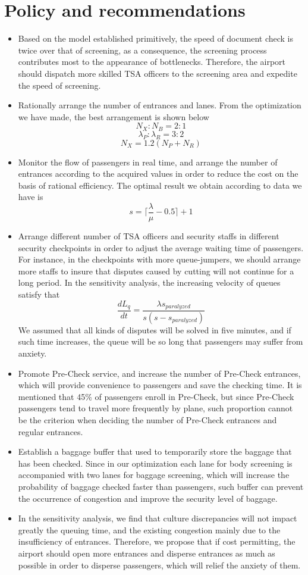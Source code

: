 \documentclass{mcmthesis}
\begin{document}
\section{Policy and recommendations}
\begin{itemize}
\item Based on the model established primitively, the speed of document check is twice over that of screening, as a consequence, the screening process contributes most to the appearance of bottlenecks. Therefore, the airport should dispatch more skilled TSA officers to the screening area and expedite the speed of screening.
\item Rationally arrange the number of entrances and lanes. From the optimization we have made, the best arrangement is shown below
$$N_X:N_B=2:1$$
$$\lambda_P:\lambda_R=3:2$$
$$N_X=1.2(N_P+N_R)$$
\item Monitor the flow of passengers in real time, and arrange the number of entrances according to the acquired values in order to reduce the cost on the basis of rational efficiency. The optimal result we obtain according to data we have is
$$s=\lceil\frac{\lambda}{\mu}-0.5\rceil+1$$
\item Arrange different number of TSA officers and security staffs in different security checkpoints in order to adjust the average waiting time of passengers. For instance, in the checkpoints with more queue-jumpers, we should arrange more staffs to insure that disputes caused by cutting will not continue for a long period. In the sensitivity analysis, the increasing velocity of queues satisfy that
$$\frac{dL_q}{dt}=\frac{\lambda s_{paralyzed}}{s(s-s_{paralyzed})}$$
We assumed that all kinds of disputes will be solved in five minutes, and if such time increases, the queue will be so long that passengers may suffer from anxiety.
\item Promote Pre-Check service, and increase the number of Pre-Check entrances, which will provide convenience to passengers and save the checking time. It is mentioned that 45\% of passengers enroll in Pre-Check, but since Pre-Check passengers tend to travel more frequently by plane, such proportion cannot be the criterion when deciding the number of Pre-Check entrances and regular entrances.
\item Establish a baggage buffer that used to temporarily store the baggage that has been checked. Since in our optimization each lane for body screening is accompanied with two lanes for baggage screening, which will increase the probability of baggage checked faster than passengers, such buffer can prevent the occurrence of congestion and improve the security level of baggage.
\item In the sensitivity analysis, we find that culture discrepancies will not impact greatly the queuing time, and the existing congestion mainly due to the insufficiency of entrances. Therefore, we propose that if cost permitting, the airport should open more entrances and disperse entrances as much as possible in order to disperse passengers, which will relief the anxiety of them.
\end{itemize}
\end{document}
